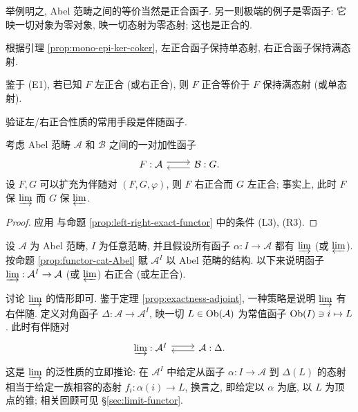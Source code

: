 举例明之, Abel 范畴之间的等价当然是正合函子. 另一则极端的例子是零函子: 它映一切对象为零对象, 映一切态射为零态射; 这也是正合的.

根据引理 \ref{prop:mono-epi-ker-coker}, 左正合函子保持单态射, 右正合函子保持满态射.

\begin{remark}\label{rem:exactness-mono-epi}
	鉴于 (E1), 若已知 $F$ 左正合 (或右正合), 则 $F$ 正合等价于 $F$ 保持满态射 (或单态射).
\end{remark}

验证左/右正合性质的常用手段是伴随函子.

\begin{theorem}\label{prop:exactness-adjoint}
	考虑 Abel 范畴 $\mathcal{A}$ 和 $\mathcal{B}$ 之间的一对加性函子
	\[\begin{tikzcd}
		F: \mathcal{A} \arrow[r, yshift=0.3em] & \mathcal{B} :G \arrow[l, yshift=-0.3em] .
	\end{tikzcd}\]
	设 $F, G$ 可以扩充为伴随对 $(F, G, \varphi)$, 则 $F$ 右正合而 $G$ 左正合; 事实上, 此时 $F$ 保 $\varinjlim$ 而 $G$ 保 $\varprojlim$.
\end{theorem}
\begin{proof}
	应用 \cite[定理 2.8.12]{Li1} 与命题 \ref{prop:left-right-exact-functor} 中的条件 (L3), (R3).
\end{proof}

\begin{example}\label{eg:limit-exactness}
	设 $\mathcal{A}$ 为 Abel 范畴, $I$ 为任意范畴, 并且假设所有函子 $\alpha: I \to \mathcal{A}$ 都有 $\varinjlim$ (或 $\varprojlim$). 按命题 \ref{prop:functor-cat-Abel} 赋 $\mathcal{A}^I$ 以 Abel 范畴的结构. 以下来说明函子 $\varinjlim: \mathcal{A}^I \to \mathcal{A}$ (或 $\varprojlim$) 右正合 (或左正合).
	
	讨论 $\varinjlim$ 的情形即可. 鉴于定理 \ref{prop:exactness-adjoint}, 一种策略是说明 $\varinjlim$ 有右伴随. 定义对角函子 $\Delta: \mathcal{A} \to \mathcal{A}^I$, 映一切 $L \in \operatorname{Ob}(\mathcal{A})$ 为常值函子 $\operatorname{Ob}(I) \ni i \mapsto L$. 此时有伴随对
	\[\begin{tikzcd}
		\varinjlim : \mathcal{A}^I \arrow[shift left, r] & \mathcal{A}: \Delta \arrow[l, shift left] .
	\end{tikzcd}\]
	这是 $\varinjlim$ 的泛性质的立即推论: 在 $\mathcal{A}^I$ 中给定从函子 $\alpha: I \to \mathcal{A}$ 到 $\Delta(L)$ 的态射相当于给定一族相容的态射 $f_i: \alpha(i) \to L$, 换言之, 即给定以 $\alpha$ 为底, 以 $L$ 为顶点的锥; 相关回顾可见 \S\ref{sec:limit-functor}.
\end{example}

